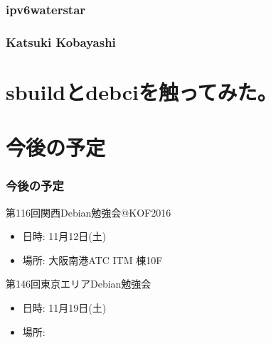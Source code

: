 \documentclass[cjk,dvipdfmx,10pt,compress,%
hyperref={bookmarks=true,bookmarksnumbered=true,bookmarksopen=false,%
colorlinks=false,%
pdftitle={第 115 回 関西 Debian 勉強会},%
pdfauthor={倉敷・のがた・佐々木・かわだ・オオツキ},%
pdfsubject={資料},%
}]{beamer}
\begin{document}
\begin{frame}
  \frametitle{ ipv6waterstar }
\end{frame}

\begin{frame}
  \frametitle{ Katsuki Kobayashi }
\end{frame}


\section{sbuildとdebciを触ってみた。}


\section{今後の予定}
\begin{frame}[fragile]
  \frametitle{今後の予定}

  \begin{block}{第116回関西Debian勉強会@KOF2016}
    \begin{itemize}
    \item 日時: 11月12日(土)
    \item 場所: 大阪南港ATC ITM 棟10F
    \end{itemize}
  \end{block}

  \begin{block}{第146回東京エリアDebian勉強会}
    \begin{itemize}
    \item 日時: 11月19日(土)
    \item 場所:
    \end{itemize}
  \end{block}

\end{frame}

\takahashi[50]{  }
\end{document}
